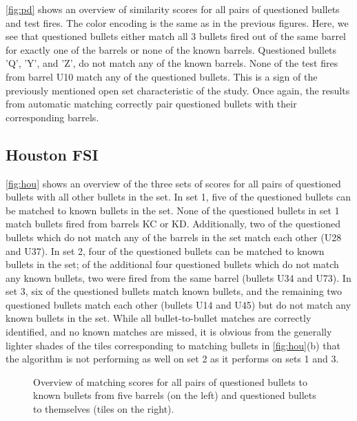 \documentclass[doubleblind]{elsarticle}\usepackage[]{graphicx}\usepackage[]{color}
\newenvironment{knitrout}{}{} %
\begin{document}
\autoref{fig:pd} shows an overview of similarity scores for all pairs of questioned bullets and  test fires. The color encoding is the same as in the previous figures. Here, we see that questioned bullets either match all 3 bullets fired out of the same barrel for exactly one of the barrels or none of the known barrels. Questioned bullets 'Q', 'Y', and 'Z', do not match any of the known barrels.
None of the test fires from barrel U10 match any of the questioned bullets.  This is a sign of the previously mentioned open set characteristic of the study. 
Once again, the results from automatic matching correctly pair questioned bullets with their corresponding barrels.

\subsection{Houston FSI}

\autoref{fig:hou} shows an overview of the three sets of scores for all pairs of questioned bullets with all other bullets in the set. In set 1, five of the questioned bullets can be matched to known bullets in the set. None of the questioned bullets in set 1 match bullets fired from barrels KC or KD. Additionally, two of the questioned bullets which do not match any of the barrels in the set match each other (U28 and U37). In set 2, four of the questioned bullets can be matched to known bullets in the set; of the additional four questioned bullets which do not match any known bullets, two were fired from the same barrel (bullets U34 and U73). In set 3, six of the questioned bullets match known bullets, and the remaining two questioned bullets match each other (bullets U14 and U45) but do not match any known bullets in the set. 
While all bullet-to-bullet matches are correctly identified, and no known matches are missed, it is obvious from the generally lighter shades of the tiles corresponding to matching bullets in \autoref{fig:hou}(b) that the algorithm is not performing as well on set 2 as it performs on sets 1 and 3.

\begin{knitrout}
\color{fgcolor}\begin{figure}
\newline
{}\newline
{}\caption[Overview of matching scores for all pairs of questioned bullets to known bullets from five barrels (on the left) and questioned bullets to themselves (tiles on the right)]{Overview of matching scores for all pairs of questioned bullets to known bullets from five barrels (on the left) and questioned bullets to themselves (tiles on the right).}\label{fig:hou}
\end{figure}


\end{knitrout}
\end{document}
